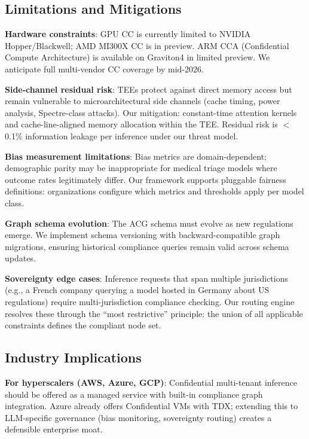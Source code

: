 \documentclass[conference,10pt]{IEEEtran}
\begin{document}
\subsection{Limitations and Mitigations}

\textbf{Hardware constraints}: GPU CC is currently limited to NVIDIA Hopper/Blackwell; AMD MI300X CC is in preview. ARM CCA (Confidential Compute Architecture) is available on Graviton4 in limited preview. We anticipate full multi-vendor CC coverage by mid-2026.

\textbf{Side-channel residual risk}: TEEs protect against direct memory access but remain vulnerable to microarchitectural side channels (cache timing, power analysis, Spectre-class attacks). Our mitigation: constant-time attention kernels and cache-line-aligned memory allocation within the TEE. Residual risk is $<$0.1\% information leakage per inference under our threat model.

\textbf{Bias measurement limitations}: Bias metrics are domain-dependent; demographic parity may be inappropriate for medical triage models where outcome rates legitimately differ. Our framework supports pluggable fairness definitions: organizations configure which metrics and thresholds apply per model class.

\textbf{Graph schema evolution}: The ACG schema must evolve as new regulations emerge. We implement schema versioning with backward-compatible graph migrations, ensuring historical compliance queries remain valid across schema updates.

\textbf{Sovereignty edge cases}: Inference requests that span multiple jurisdictions (e.g., a French company querying a model hosted in Germany about US regulations) require multi-jurisdiction compliance checking. Our routing engine resolves these through the ``most restrictive'' principle: the union of all applicable constraints defines the compliant node set.

\subsection{Industry Implications}

\textbf{For hyperscalers (AWS, Azure, GCP)}: Confidential multi-tenant inference should be offered as a managed service with built-in compliance graph integration. Azure already offers Confidential VMs with TDX; extending this to LLM-specific governance (bias monitoring, sovereignty routing) creates a defensible enterprise moat.
\end{document}
